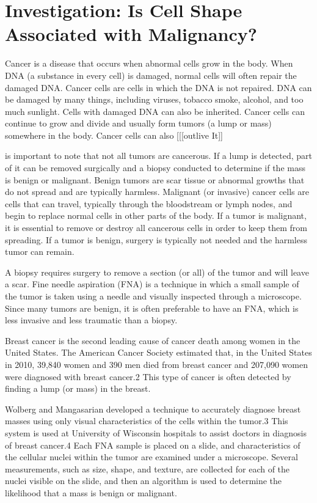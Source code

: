 \documentclass[
]{book}
\begin{document}
\hypertarget{investigation-is-cell-shape-associated-with-malignancy}{%
\section{Investigation: Is Cell Shape Associated with Malignancy?}\label{investigation-is-cell-shape-associated-with-malignancy}}

Cancer is a disease that occurs when abnormal cells grow in the body. When DNA (a substance in every
cell) is damaged, normal cells will often repair the damaged DNA. Cancer cells are cells in which the
DNA is not repaired. DNA can be damaged by many things, including viruses, tobacco smoke, alcohol, and too much sunlight. Cells with damaged DNA can also be inherited. Cancer cells can continue to grow and divide and usually form tumors (a lump or mass) somewhere in the body. Cancer cells can also {[}{[}{[}outlive It{]}{]}

is important to note that not all tumors are cancerous. If a lump is detected, part of it can be removed surgically and a biopsy conducted to determine if the mass is benign or malignant. Benign tumors are scar tissue or abnormal growths that do not spread and are typically harmless. Malignant (or invasive) cancer cells are cells that can travel, typically through the bloodstream or lymph nodes, and begin to replace normal cells in other parts of the body. If a tumor is malignant, it is essential to remove or destroy all cancerous cells in order to keep them from spreading. If a tumor is benign, surgery is typically not needed and the harmless tumor can remain.

A biopsy requires surgery to remove a section (or all) of the tumor and will leave a scar. Fine needle
aspiration (FNA) is a technique in which a small sample of the tumor is taken using a needle and visually inspected through a microscope. Since many tumors are benign, it is often preferable to have an FNA, which is less invasive and less traumatic than a biopsy.

Breast cancer is the second leading cause of cancer death among women in the United States. The
American Cancer Society estimated that, in the United States in 2010, 39,840 women and 390 men died from
breast cancer and 207,090 women were diagnosed with breast cancer.2 This type of cancer is often detected by finding a lump (or mass) in the breast.

Wolberg and Mangasarian developed a technique to accurately diagnose breast masses using only visual
characteristics of the cells within the tumor.3 This system is used at University of Wisconsin hospitals to assist doctors in diagnosis of breast cancer.4 Each FNA sample is placed on a slide, and characteristics of the cellular nuclei within the tumor are examined under a microscope. Several measurements, such as size, shape, and texture, are collected for each of the nuclei visible on the slide, and then an algorithm is used to determine the likelihood that a mass is benign or malignant.
\end{document}
